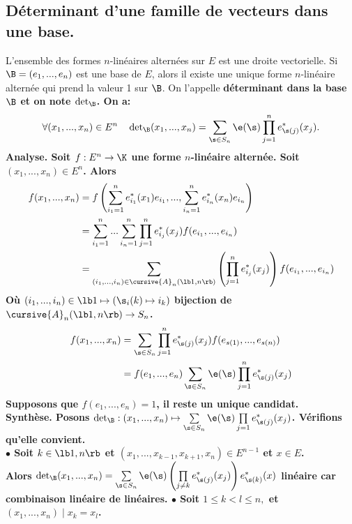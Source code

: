 \documentclass[11pt]{article}
\begin{document}
\subsection{Déterminant d'une famille de vecteurs dans une base.}

\begin{thm}{}{}
    L'ensemble des formes $n$-linéaires alternées sur $E$ est une droite vectorielle.\n
    Si $\B=(e_1,...,e_n)$ est une base de $E$, alors il existe une unique forme $n$-linéaire alternée qui prend la valeur 1 sur $\B$. On l'appelle \bf{déterminant dans la base $\B$} et on note $\det_\B$. On a:
    \begin{equation*}
        \forall (x_1,...,x_n)\in E^n \quad \det\nolimits_\B(x_1,...,x_n)=\sum_{\s\in S_n}\e(\s)\prod_{j=1}^ne^*_{\s(j)}(x_j).
    \end{equation*}
    \tcblower
    \bf{Analyse.} Soit $f:E^n\to\K$ une forme $n$-linéaire alternée. Soit $(x_1,...,x_n)\in E^n$. Alors
    \begin{align*}
        f(x_1,...,x_n)&=f\left(\sum_{i_1=1}^ne_{i_1}^*(x_1)e_{i_1},...,\sum_{i_n=1}^ne_{i_n}^*(x_n)e_{i_n}\right)\\
        &= \sum_{i_1=1}^n...\sum_{i_n=1}^n\prod_{j=1}^ne_{i_j}^*(x_j)f(e_{i_1},...,e_{i_n})\\
        &= \sum_{(i_1,...,i_n)\in\cursive{A}_n(\lb1,n\rb)}\left( \prod_{j=1}^ne_{i_j}^*(x_j) \right)f(e_{i_1},...,e_{i_n})
    \end{align*}
    Où $(i_1,...,i_n)\in\lb1 \mapsto (\s_i(k)\mapsto i_k)$ bijection de $\cursive{A}_n(\lb1,n\rb)\to S_n$.
    \begin{align*}
        f(x_1,...,x_n)&=\sum_{\s\in S_n}\prod_{j=1}^ne_{\s(j)}^*(x_j)f(e_{s(1)},...,e_{s(n)})\\
        &=f(e_1,...,e_n)\sum_{\s\in S_n}\e(\s)\prod_{j=1}^ne_{\s(j)}^*(x_j)
    \end{align*}
    Supposons que $f(e_1,...,e_n)=1$, il reste un unique candidat.\\
    \bf{Synthèse.} Posons $\det_\B:(x_1,...,x_n)\mapsto \sum\limits_{\s\in S_n}\e(\s)\prod\limits_{j=1}e_{\s(j)}^*(x_j)$. Vérifions qu'elle convient.\\
    $\bullet$ Soit $k\in\lb1,n\rb$ et $(x_1,...,x_{k-1},x_{k+1},x_n)\in E^{n-1}$ et $x\in E$.\\
    Alors $\det_\B(x_1,...,x_n)=\sum\limits_{\s\in S_n}\e(\s)\left(\prod\limits_{j\neq k}e^*_{\s(j)}(x_j)\right)e^*_{\s(k)}(x)$ linéaire car combinaison linéaire de linéaires.\n
    $\bullet$ Soit $1\leq k < l \leq n,$ et $(x_1,...,x_n) \mid x_k = x_l$.\\

\end{thm}
\end{document}
